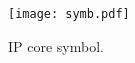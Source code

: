 \begin{figure}[!htbp]
  \centerline{\texttt{[image: symb.pdf]}}
  \vspace{0cm}
  \caption{IP core symbol.}
  \label{fig:symbol}
\end{figure}

